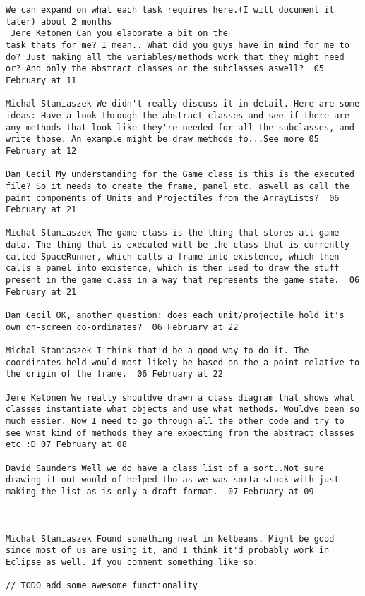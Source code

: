 \documentclass[10pt]{report}
\begin{document}
\begin{verbatim}
We can expand on what each task requires here.(I will document it
later) about 2 months 
 Jere Ketonen Can you elaborate a bit on the
task thats for me? I mean.. What did you guys have in mind for me to
do? Just making all the variables/methods work that they might need
or? And only the abstract classes or the subclasses aswell?  05
February at 11

Michal Staniaszek We didn't really discuss it in detail. Here are some
ideas: Have a look through the abstract classes and see if there are
any methods that look like they're needed for all the subclasses, and
write those. An example might be draw methods fo...See more 05
February at 12

Dan Cecil My understanding for the Game class is this is the executed
file? So it needs to create the frame, panel etc. aswell as call the
paint components of Units and Projectiles from the ArrayLists?  06
February at 21

Michal Staniaszek The game class is the thing that stores all game
data. The thing that is executed will be the class that is currently
called SpaceRunner, which calls a frame into existence, which then
calls a panel into existence, which is then used to draw the stuff
present in the game class in a way that represents the game state.  06
February at 21

Dan Cecil OK, another question: does each unit/projectile hold it's
own on-screen co-ordinates?  06 February at 22

Michal Staniaszek I think that'd be a good way to do it. The
coordinates held would most likely be based on the a point relative to
the origin of the frame.  06 February at 22

Jere Ketonen We really shouldve drawn a class diagram that shows what
classes instantiate what objects and use what methods. Wouldve been so
much easier. Now I need to go through all the other code and try to
see what kind of methods they are expecting from the abstract classes
etc :D 07 February at 08

David Saunders Well we do have a class list of a sort..Not sure
drawing it out would of helped tho as we was sorta stuck with just
making the list as is only a draft format.  07 February at 09



Michal Staniaszek Found something neat in Netbeans. Might be good
since most of us are using it, and I think it'd probably work in
Eclipse as well. If you comment something like so:

// TODO add some awesome functionality


\end{verbatim}
\end{document}
